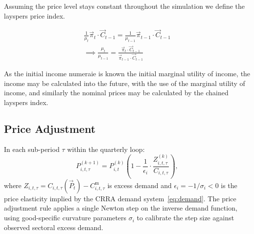 Assuming the price level stays constant throughout the simulation we define the layspers price index.

\begin{multline}
    \frac{1}{\mu_{t}} \vec{\pi}_{t} \cdot \vec{C}_{t-1} =  \frac{1}{\mu_{t-1}} \vec{\pi}_{t-1} \cdot \vec{C}_{t-1} \\ \implies
    \frac{\mu_{t}}{\mu_{t-1}} = \frac{\vec{\pi}_{t} \cdot \vec{C}_{t-1}}{\vec{\pi}_{t-1} \cdot \vec{C}_{t-1}}
\end{multline}

As the initial income numeraie is known the initial marginal utility of income, the income may be calculated into the future, with the use of the marginal utility of income, and similarly the nominal prices may be calculated by the chained layspers index.

\subsection{Price Adjustment} \label{stability}
In each sub-period $\tau$ within the quarterly loop:
\begin{equation}\label{eq:tatonnement}
    P_{i,t,\tau}^{(k+1)} = P^{(k)}_{i,t}
    \left(1 - \frac{1}{\epsilon_i}
              \cdot \frac{Z^{(k)}_{i,t,\tau}}{C_{i,t,\tau}}
    \right),
\end{equation}
where $Z_{i,t,\tau} = C_{i,t,\tau}(\vec{P}_{t}) -
C^{\mathrm{m}}_{i,t,\tau}$ is excess demand and $\epsilon_i = -1/\sigma_i < 0$
is the price elasticity implied by the CRRA demand
system~\eqref{eq:demand}. The price adjustment rule applies a single
Newton step on the inverse demand function, using good-specific
curvature parameters $\sigma_i$ to calibrate the step size against
observed sectoral excess demand.
